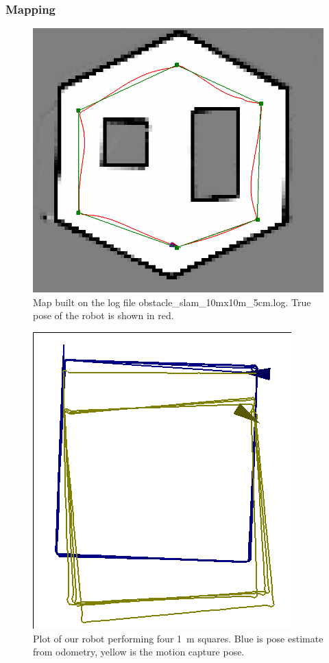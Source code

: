 \documentclass[journal]{IEEEtran}
\begin{document}
        \subsubsection{Mapping}
            \begin{figure}[b]
                \centering
                \includegraphics[width=1\linewidth]{obstacle_slam_10mx10m_5cm-map.png}
                \caption{Map built on the log file obstacle\_slam\_10mx10m\_5cm.log. True pose of the robot is shown in red.}
                \label{fig:map}
            \end{figure}
            
            \begin{figure}[b]
                \centering
                \includegraphics[width=0.75\linewidth]{odometry4.png}
                \caption{Plot of our robot performing four \SI{1}{\meter} squares. Blue is pose estimate from odometry, yellow is the motion capture pose.}
                \label{fig:odometry_squares}
            \end{figure}
    
\end{document}
